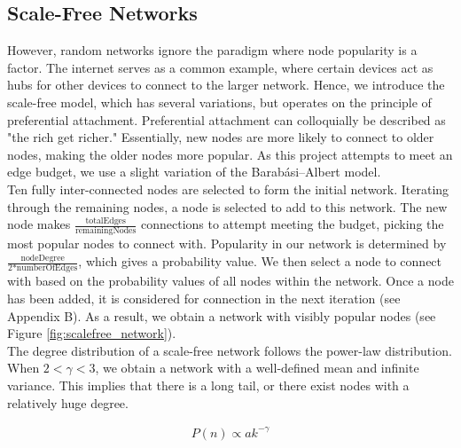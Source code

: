 \documentclass[journal]{IEEEtran}
\begin{document}
\subsection{Scale-Free Networks}
\noindent However, random networks ignore the paradigm where node popularity is a factor. The internet serves as a common example, where certain devices act as hubs for other devices to connect to the larger network. Hence, we introduce the scale-free model, which has several variations, but operates on the principle of preferential attachment. Preferential attachment can colloquially be described as "the rich get richer." Essentially, new nodes are more likely to connect to older nodes, making the older nodes more popular. As this project attempts to meet an edge budget, we use a slight variation of the Barabási–Albert model.\\

\noindent Ten fully inter-connected nodes are selected to form the initial network. Iterating through the remaining nodes, a node is selected to add to this network. The new node makes $\frac{\text{totalEdges}}{\text{remainingNodes}}$ connections to attempt meeting the budget, picking the most popular nodes to connect with. Popularity in our network is determined by $\frac{\text{nodeDegree}}{\text{2*numberOfEdges}}$, which gives a probability value. We then select a node to connect with based on the probability values of all nodes within the network. Once a node has been added, it is considered for connection in the next iteration (see Appendix B). As a result, we obtain a network with visibly popular nodes (see Figure \ref{fig:scalefree_network}). \\

\noindent The degree distribution of a scale-free network follows the power-law distribution. When $ 2 < \gamma < 3$, we obtain a network with a well-defined mean and infinite variance. This implies that there is a long tail, or there exist nodes with a relatively huge degree.

\begin{equation}
    \begin{split}
        P(n) \propto ak^{-\gamma}
    \end{split}
    \label{eq:poisson_distribution}
\end{equation}
\end{document}
